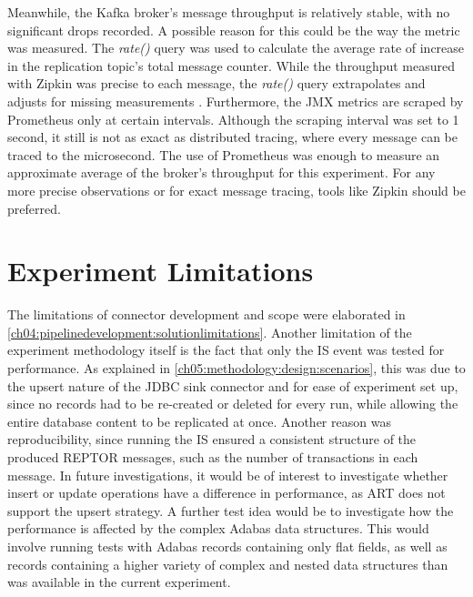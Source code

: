 Meanwhile, the Kafka broker's message throughput is relatively stable, with no significant drops recorded. A possible reason for this could be the way the metric was measured. The \textit{rate()} query was used to calculate the average rate of increase in the replication topic's total message counter. While the throughput measured with Zipkin was precise to each message, the \textit{rate()} query extrapolates and adjusts for missing measurements \cite{prometheusquery}. Furthermore, the \ac{JMX} metrics are scraped by Prometheus only at certain intervals. Although the scraping interval was set to 1 second, it still is not as exact as distributed tracing, where every message can be traced to the microsecond. The use of Prometheus was enough to measure an approximate average of the broker's throughput for this experiment. For any more precise observations or for exact message tracing, tools like Zipkin should be preferred.

\section{Experiment Limitations}
The limitations of connector development and scope were elaborated in \ref{ch04:pipelinedevelopment:solutionlimitations}. Another limitation of the experiment methodology itself is the fact that only the \ac{IS} event was tested for performance. As explained in \ref{ch05:methodology:design:scenarios}, this was due to the upsert nature of the \ac{JDBC} sink connector and for ease of experiment set up, since no records had to be re-created or deleted for every run, while allowing the entire database content to be replicated at once. Another reason was reproducibility, since running the \ac{IS} ensured a consistent structure of the produced \ac{REPTOR} messages, such as the number of transactions in each message. In future investigations, it would be of interest to investigate whether insert or update operations have a difference in performance, as \ac{ART} does not support the upsert strategy. A further test idea would be to investigate how the performance is affected by the complex Adabas data structures. This would involve running tests with Adabas records containing only flat fields, as well as records containing a higher variety of complex and nested data structures than was available in the current experiment.